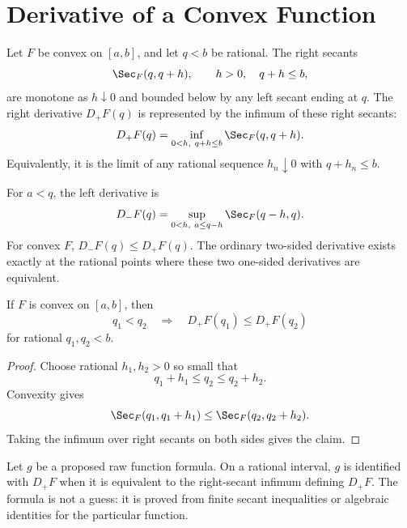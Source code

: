 \section{Derivative of a Convex Function}

\begin{definition}
\label{def:convex-right-derivative}
Let \(F\) be convex on \([a,b]\), and let \(q<b\) be rational.  The right
secants
\[
  \Sec_F(q,q+h),\qquad h>0,\quad q+h\le b,
\]
are monotone as \(h\downarrow 0\) and bounded below by any left secant ending
at \(q\).  The right derivative \(D_+F(q)\) is represented by the infimum of
these right secants:
\[
  D_+F(q)=\inf_{0<h,\ q+h\le b}\Sec_F(q,q+h).
\]
Equivalently, it is the limit of any rational sequence \(h_n\downarrow0\)
with \(q+h_n\le b\).
\end{definition}

\begin{definition}
\label{def:convex-left-derivative}
For \(a<q\), the left derivative is
\[
  D_-F(q)=\sup_{0<h,\ a\le q-h}\Sec_F(q-h,q).
\]
For convex \(F\), \(D_-F(q)\le D_+F(q)\).  The ordinary two-sided derivative
exists exactly at the rational points where these two one-sided derivatives
are equivalent.
\end{definition}

\begin{theorem}
\label{thm:convex-right-derivative-increasing}
\leanok
If \(F\) is convex on \([a,b]\), then
\[
  q_1<q_2
  \quad\Longrightarrow\quad
  D_+F(q_1)\le D_+F(q_2)
\]
for rational \(q_1,q_2<b\).
\end{theorem}

\begin{proof}
Choose rational \(h_1,h_2>0\) so small that
\[
  q_1+h_1\le q_2\le q_2+h_2.
\]
Convexity gives
\[
  \Sec_F(q_1,q_1+h_1)\le \Sec_F(q_2,q_2+h_2).
\]
Taking the infimum over right secants on both sides gives the claim.
\end{proof}

\begin{definition}\label{def:formula-identification}
Let \(g\) be a proposed raw function formula.  On a rational interval,
\(g\) is identified with \(D_+F\) when it is equivalent to the right-secant
infimum defining \(D_+F\).  The formula is not a guess: it is proved from
finite secant inequalities or algebraic identities for the particular
function.
\end{definition}


